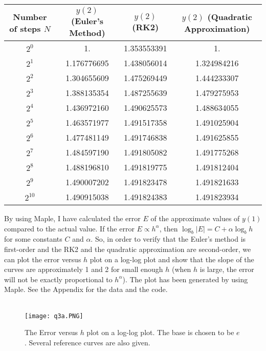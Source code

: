 \documentclass{article}
\begin{document}
\begin{center}
\begin{tabular}{||c |c| c| c||}
 \hline
  Number of steps \(N\) & \(y(2)\) (Euler's Method) & \(y(2)\) (RK2) & \(y(2)\) (Quadratic Approximation) \\ [0.5ex]
 \hline\hline
 \(2^0\)  & 1. & 1.353553391 & 1. \\
 \hline
 \(2^1\)  & 1.176776695 & 1.438056014 & 1.324984216 \\
 \hline
 \(2^2\)  & 1.304655609 & 1.475269449 & 1.444233307 \\
 \hline
 \(2^3\)  & 1.388135354 & 1.487255639 & 1.479275953 \\
 \hline
 \(2^4\)  & 1.436972160 & 1.490625573 & 1.488634055 \\
 \hline
 \(2^5\)  & 1.463571977 & 1.491517358 & 1.491025904 \\
 \hline
 \(2^6\)  & 1.477481149 & 1.491746838 & 1.491625855 \\
 \hline
 \(2^7\)  & 1.484597190 & 1.491805082 & 1.491775268 \\
 \hline
 \(2^8\)  & 1.488196810 & 1.491819775 & 1.491812404 \\
 \hline
 \(2^9\)  & 1.490007202 & 1.491823478 & 1.491821633 \\
 \hline
 \(2^{10}\) & 1.490915038 & 1.491824383 & 1.491823934 \\
 \hline
\end{tabular}
\end{center}
By using Maple, I have calculated the error \(E\) of the approximate values of \(y(1)\) compared to the actual value. If the error \(E\propto h^{\alpha}\), then \(\log_b|E| =C + \alpha \log_b h\) for some constants \(C\) and \(\alpha\).
So, in order to verify that the Euler's method is first-order and the RK2 and the quadratic approximation are second-order, we can
plot the error versus \(h\) plot on a log-log plot and show that the slope of the curves are approximately 1 and 2 for small enough \(h\) (when \(h\) is large, the error will not be exactly proportional to \(h^\alpha\)).
The plot has been generated by using Maple. See the Appendix for the data and the code.
\pagebreak \\ \\
\begin{figure}
    \centering
    \texttt{[image: q3a.PNG]}
    \caption{The Error versus \(h\) plot on a log-log plot. The base is chosen to be \(e\). Several reference curves are also given. }
    \label{fig:label1}
\end{figure}\text{ }\\
\end{document}
